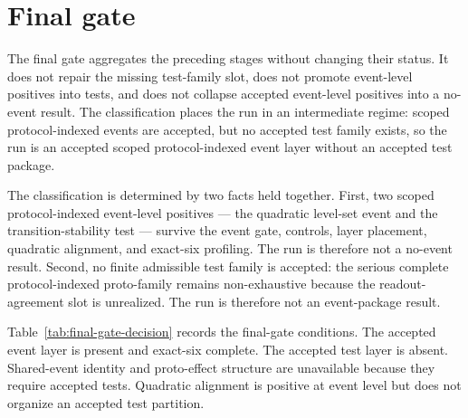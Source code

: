 \documentclass[11pt]{article}
\theoremstyle{definition}
\begin{document}
 \section{Final gate}
\label{sec:final-gate}

The final gate aggregates the preceding stages without changing their status. It does not repair the missing test-family slot, does not promote event-level positives into tests, and does not collapse accepted event-level positives into a no-event result. The classification places the run in an intermediate regime: scoped protocol-indexed events are accepted, but no accepted test family exists, so the run is an accepted scoped protocol-indexed event layer without an accepted test package.

The classification is determined by two facts held together. First, two scoped protocol-indexed event-level positives — the quadratic level-set event and the transition-stability test — survive the event gate, controls, layer placement, quadratic alignment, and exact-six profiling. The run is therefore not a no-event result. Second, no finite admissible test family is accepted: the serious complete protocol-indexed proto-family remains non-exhaustive because the readout-agreement slot is unrealized. The run is therefore not an event-package result.

Table~\ref{tab:final-gate-decision} records the final-gate conditions. The accepted event layer is present and exact-six complete. The accepted test layer is absent. Shared-event identity and proto-effect structure are unavailable because they require accepted tests. Quadratic alignment is positive at event level but does not organize an accepted test partition.
\end{document}
